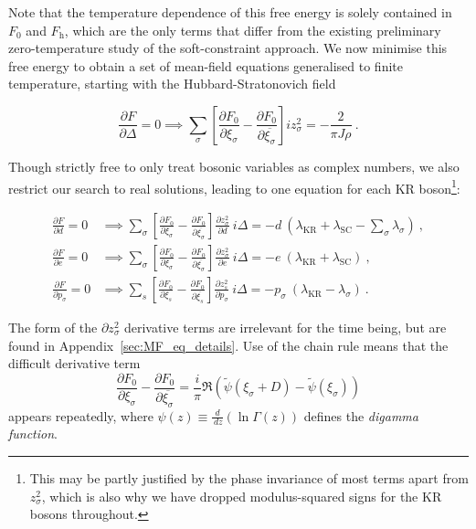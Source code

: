 
Note that the temperature dependence of this free energy is solely contained in $ F_0 $ and $ F_{\text{h}} $, which are the only terms that differ from the existing preliminary zero-temperature study of the soft-constraint approach. We now minimise this free energy to obtain a set of mean-field equations generalised to finite temperature, starting with the Hubbard-Stratonovich field

\begin{equation}
\frac{\partial F}{\partial \Delta} = 0 \implies \sum_{\sigma} \left[ \frac{\partial F_{0}}{\partial \xi_{\sigma}} - \frac{\partial F_{0}}{\partial \overline{\xi_{\sigma}}} \right] i z^2_{\sigma} = - \frac{2}{\pi J \rho} ~ .
\label{eq:MF_delta}
\end{equation}

Though strictly free to only treat bosonic variables as complex numbers, we also restrict our search to real solutions, leading to one equation for each KR boson\footnote{This may be partly justified by the phase invariance of most terms apart from $ z_{\sigma}^2 $, which is also why we have dropped modulus-squared signs for the KR bosons throughout.}: %

\begin{align}
\frac{\partial F}{\partial d} = 0 &\implies \sum_{\sigma} \left[ \frac{\partial F_{0}}{\partial \xi_{\sigma}} - \frac{\partial F_{0}}{\partial \overline{\xi_{\sigma}}} \right] \frac{\partial z^2_{\sigma}}{\partial d} ~ i \Delta = -d ~ ( \lambda_{\text{KR}} + \lambda_{\text{SC}} -  \sum_{\sigma} \lambda_{\sigma} ) ~ , \label{eq:MF_d} \\
\frac{\partial F}{\partial e} = 0 &\implies \sum_{\sigma} \left[ \frac{\partial F_{0}}{\partial \xi_{\sigma}} - \frac{\partial F_{0}}{\partial \overline{\xi_{\sigma}}} \right] \frac{\partial z^2_{\sigma}}{\partial e} ~ i \Delta = -e ~ ( \lambda_{\text{KR}} + \lambda_{\text{SC}} ) ~ , \label{eq:MF_e} \\
\frac{\partial F}{\partial p_{\sigma}} = 0 &\implies \sum_{s} \left[ \frac{\partial F_{0}}{\partial \xi_{s}} - \frac{\partial F_{0}}{\partial \overline{\xi_{s}}} \right] \frac{\partial z^2_{s}}{\partial p_{\sigma}} ~ i \Delta = - p_{\sigma} ~ (\lambda_{\text{KR}} - \lambda_{\sigma}) ~ . \label{eq:MF_p}
\end{align}

The form of the $ \partial z^2_{\sigma} $ derivative terms are irrelevant for the time being, but are found in Appendix~\ref{sec:MF_eq_details}. Use of the chain rule means that the difficult derivative term
\begin{equation}
\frac{\partial F_{0}}{\partial \xi_{\sigma}} - \frac{\partial F_{0}}{\partial \overline{\xi_{\sigma}}} = \frac{i}{\pi} \Re{( \widetilde{\psi}(\xi_{\sigma} + D) - \widetilde{\psi}(\xi_{\sigma}))}
\label{eq:real_derivative}
\end{equation}
appears repeatedly, where $ \psi(z) \equiv \frac{d}{\,dz}(\ln{\Gamma(z)}) $ defines the \textit{digamma function}.

